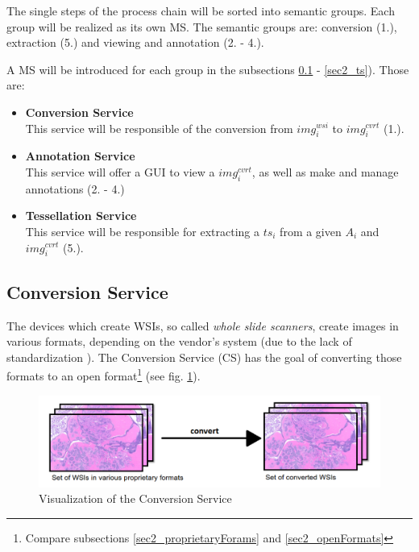 The single steps of the process chain will be sorted into semantic groups. Each group will be realized as its own MS. The semantic groups are: conversion (1.), extraction (5.) and viewing and annotation (2. - 4.).

A MS will be introduced for each group in the subsections \ref{sec2_cs} - \ref{sec2_ts}). Those are:

\begin{itemize}
	\item \textbf{Conversion Service}\\
	This service will be responsible of the conversion from $img^{wsi}_i$ to $img^{cvrt}_i$ (1.).
	\item \textbf{Annotation Service}\\
	This service will offer a GUI to view a $img^{cvrt}_i$, as well as make and manage annotations (2. - 4.)
	\item \textbf{Tessellation Service}\\
	This service will be responsible for extracting a $ts_i$ from a given $A_i$ and $img^{cvrt}_i$ (5.).
\end{itemize}


\subsection{Conversion Service}
\label{sec2_cs}
The devices which create WSIs, so called \emph{whole slide scanners}, create images in various formats, depending on the vendor's system (due to the lack of standardization \cite{Cornish13}). The Conversion Service (CS) has the goal of converting those formats to an open format\footnote{Compare subsections \ref{sec2_proprietaryForams} and \ref{sec2_openFormats}} (see fig. \ref{fig2_processChainA}).

\begin{figure}[H]
	\begin{center}
		\includegraphics[scale=0.35]{img/processChainA.png}
		\caption{Visualization of the Conversion Service}
		\label{fig2_processChainA}
	\end{center}
\end{figure}

